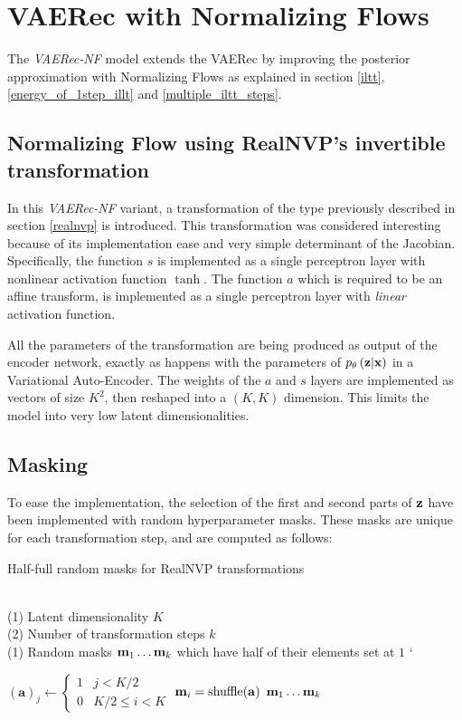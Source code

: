 \section{VAERec with Normalizing Flows}

The \emph{VAERec-NF} model
extends the VAERec by improving the posterior approximation
with Normalizing Flows \cite{1505.05770}
as explained in section \ref{iltt}, 
\ref{energy_of_1step_illt}
and \ref{multiple_iltt_steps}.

\subsection{Normalizing Flow using RealNVP's invertible transformation}

In this \emph{VAERec-NF} variant, a transformation of the type previously described
in section \ref{realnvp} is introduced.
This transformation was considered interesting 
because of its implementation
ease and very simple determinant of the Jacobian.
Specifically, the function $s$ is implemented as
a single perceptron layer with nonlinear activation function 
$\tanh$. The function $a$ which is required to be an affine transform,
is implemented as a single perceptron layer with \emph{linear}
activation function.

All the parameters of the transformation are being produced as output of the
encoder network, exactly as happens with the parameters of $p_\theta\left(\mathbf{z}|\mathbf{x}\right)$ in a Variational
Auto-Encoder.
The weights of the $a$ and $s$ layers are implemented as vectors of size $K^2$, then
reshaped into a $(K,K)$ dimension. This limits the model into
very low latent dimensionalities.

\subsection{Masking}

To ease the implementation, the selection of the first and second parts of $\mathbf{z}$
have been implemented with random hyperparameter masks. These masks are unique for each transformation
step, and are computed as follows:

\begin{algorithm}[H]
\caption{Half-full random masks for RealNVP transformations}
\begin{algorithmic}[1]

\REQUIRE ~~\\
(1) Latent dimensionality $K$ \\
(2) Number of transformation steps $k$
\ENSURE~~\\
(1) Random masks $\mathbf{m}_1 \ldots \mathbf{m}_k$ which have half of their elements set at $1$
`
\item[]
\STATE $(\mathbf{a})_j \leftarrow \left\{\begin{array}{ll} 1 & j < K/2 \\ 0 & K/2 \leq i < K\end{array}\right.$
\STATE $\mathbf{m}_i = \mathrm{shuffle}(\mathbf{a})$
\ENDFOR
\RETURN $\mathbf{m}_1 \ldots \mathbf{m}_k$
\end{algorithmic}
\end{algorithm}
                                         
